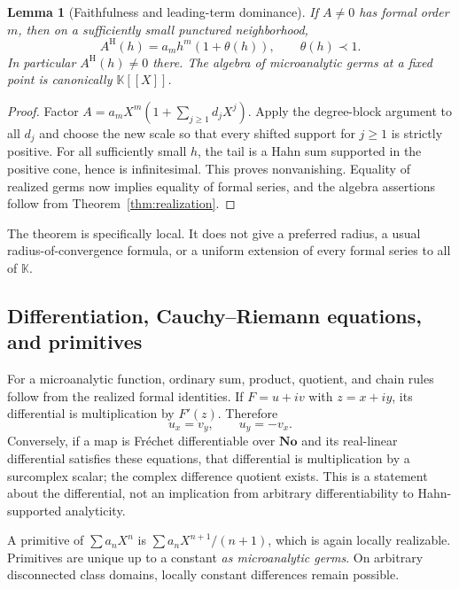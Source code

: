 \documentclass[11pt,oneside]{article}
\newtheorem{lemma}[theorem]{Lemma}
\theoremstyle{definition}\newtheorem{definition}[theorem]{Definition}
\newcommand{\No}{\mathbf{No}}
\newcommand{\K}{\mathbb K}
\newcommand{\htop}{\mathrm H}
\begin{document}
\begin{lemma}[Faithfulness and leading-term dominance]\label{lem:faithful}
If $A\ne0$ has formal order $m$, then on a sufficiently small punctured neighborhood,
\[
 A^{\htop}(h)=a_mh^m(1+\theta(h)),\qquad \theta(h)\prec1.
\]
In particular $A^{\htop}(h)\ne0$ there. The algebra of microanalytic germs at a fixed point is canonically $\K[[X]]$.
\end{lemma}
\begin{proof}
Factor $A=a_mX^m(1+\sum_{j\geq1}d_jX^j)$. Apply the degree-block argument to all $d_j$ and choose the new scale so that every shifted support for $j\geq1$ is strictly positive. For all sufficiently small $h$, the tail is a Hahn sum supported in the positive cone, hence is infinitesimal. This proves nonvanishing. Equality of realized germs now implies equality of formal series, and the algebra assertions follow from Theorem~\ref{thm:realization}.
\end{proof}
The theorem is specifically local. It does not give a preferred radius, a usual radius-of-convergence formula, or a uniform extension of every formal series to all of $\K$.

\subsection{Differentiation, Cauchy--Riemann equations, and primitives}
For a microanalytic function, ordinary sum, product, quotient, and chain rules follow from the realized formal identities. If $F=u+iv$ with $z=x+iy$, its differential is multiplication by $F'(z)$. Therefore
\[
 u_x=v_y,\qquad u_y=-v_x.
\]
Conversely, if a map is Fr\'echet differentiable over $\No$ and its real-linear differential satisfies these equations, that differential is multiplication by a surcomplex scalar; the complex difference quotient exists. This is a statement about the differential, not an implication from arbitrary differentiability to Hahn-supported analyticity.

A primitive of $\sum a_nX^n$ is $\sum a_nX^{n+1}/(n+1)$, which is again locally realizable. Primitives are unique up to a constant \emph{as microanalytic germs}. On arbitrary disconnected class domains, locally constant differences remain possible.
\end{document}
